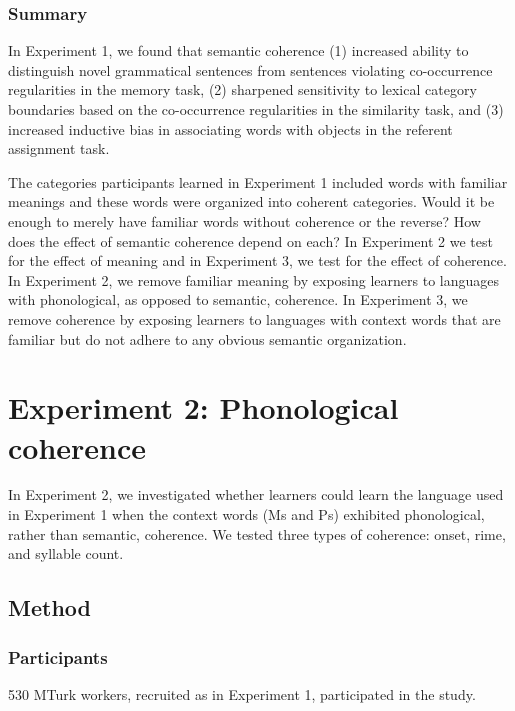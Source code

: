 \documentclass[man,floatsintext]{apa6}
\begin{document}
\subsubsection{Summary}

In Experiment 1, we found that semantic coherence (1) increased ability to distinguish novel grammatical sentences from sentences violating co-occurrence regularities in the memory task, (2) sharpened sensitivity to lexical category boundaries based on the co-occurrence regularities in the similarity task, and (3) increased inductive bias in associating words with objects in the referent assignment task.

The categories participants learned in Experiment 1 included words with familiar meanings and these words were organized into coherent categories. Would it be enough to merely have familiar words without coherence or the reverse? How does the effect of semantic coherence depend on each? In Experiment 2 we test for the effect of meaning and in Experiment 3, we test for the effect of coherence. In Experiment 2, we remove familiar meaning by exposing learners to languages with phonological, as opposed to semantic, coherence. In Experiment 3, we remove coherence by exposing learners to languages with context words that are familiar but do not adhere to any obvious semantic organization.

\section{Experiment 2: Phonological coherence}

In Experiment 2, we investigated whether learners could learn the language used in  Experiment 1 when the context words (Ms and Ps) exhibited phonological, rather than semantic, coherence. We tested three types of coherence: onset, rime, and syllable count.

\subsection{Method}
\subsubsection{Participants} 
530 MTurk workers, recruited as in Experiment 1, participated in the study.
\end{document}
